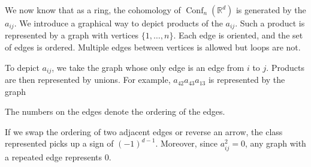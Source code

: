 \documentclass{shortart}
\theoremstyle{definition}
\DeclareMathOperator\Conf{Conf}
\newcommand\R{\mathbb{R}}
\begin{document}
We now know that as a ring, the cohomology of $\Conf_n(\R^d)$ is generated by the $a_{ij}$. We introduce a graphical way to depict products of the $a_{ij}$. Such a product is represented by a graph with vertices $\{1, \ldots, n\}$. Each edge is oriented, and the set of edges is ordered. Multiple edges between vertices is allowed but loops are not.

To depict $a_{ij}$, we take the graph whose only edge is an edge from $i$ to $j$. Products are then represented by unions. For example, $a_{42} a_{43} a_{13}$ is represented by the graph
\begin{center}
\end{center}
The numbers on the edges denote the ordering of the edges.

If we swap the ordering of two adjacent edges or reverse an arrow, the class represented picks up a sign of $(-1)^{d - 1}$. Moreover, since $a_{ij}^2 = 0$, any graph with a repeated edge represents $0$.
\end{document}
